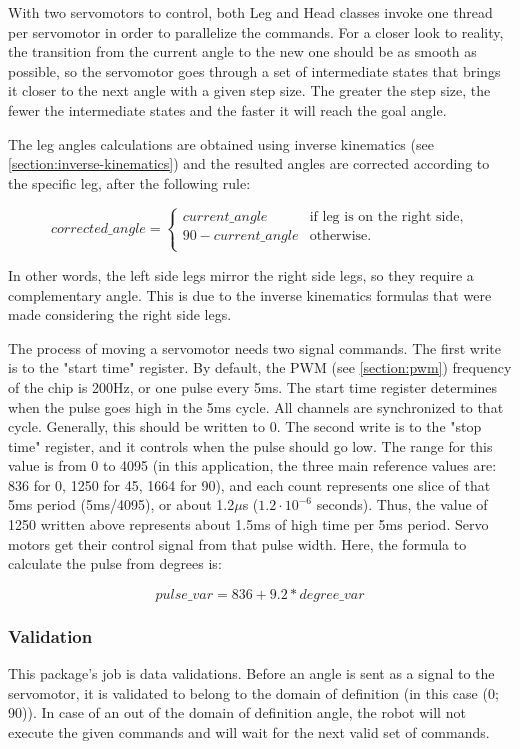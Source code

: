 \documentclass[runningheads,a4paper,12pt]{report}
\begin{document}
With two servomotors to control, both Leg and Head classes invoke one thread per servomotor in order to parallelize the commands. For a closer look to reality, the transition from the current angle to the new one should be as smooth as possible, so the servomotor goes through a set of intermediate states that brings it closer to the next angle with a given step size. The greater the step size, the fewer the intermediate states  and the faster it will reach the goal angle. 

The leg angles calculations are obtained using inverse kinematics (see \ref{section:inverse-kinematics}) and the resulted angles are corrected according to the specific leg, after the following rule:

\begin{equation*}
    corrected\_angle = \begin{cases}
               current\_angle  & \text{if leg is on the right side,}\\
               90 - current\_angle  & \text{otherwise.}\\
               \end{cases}
\end{equation*}

In other words, the left side legs mirror the right side legs, so they require a complementary angle. This is due to the inverse kinematics formulas that were made considering the right side legs. 

The process of moving a servomotor needs two signal commands. The first write is to the "start time" register. By default, the PWM (see \ref{section:pwm}) frequency of the chip is 200Hz, or one pulse every 5ms. The start time register determines when the pulse goes high in the 5ms cycle. All channels are synchronized to that cycle. Generally, this should be written to 0. The second write is to the "stop time" register, and it controls when the pulse should go low. The range for this value is from 0 to 4095 (in this application, the three main reference values are: 836 for 0\textdegree, 1250 for 45\textdegree, 1664 for 90\textdegree), and each count represents one slice of that 5ms period (5ms/4095), or about 1.2$\mu$s ($1.2 \cdot 10^{-6}$ seconds). Thus, the value of 1250 written above represents about 1.5ms of high time per 5ms period. Servo motors get their control signal from that pulse width. Here, the formula to calculate the pulse from degrees is: 

\[pulse\_var = 836 + 9.2 * degree\_var\]

\subsubsection{Validation}
This package's job is data validations. Before an angle is sent as a signal to the servomotor, it is validated to belong to the domain of definition (in this case (0\textdegree; 90\textdegree)). In case of an out of the domain of definition angle, the robot will not execute the given commands and will wait for the next valid set of commands.
\end{document}
